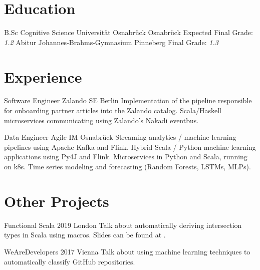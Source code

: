 \documentclass[10pt,a4paper,sans]{moderncv}
\begin{document}
\makecvtitle

\section{Education}
        {B.Sc Cognitive Science}
        {Universität Osnabrück}
        {Osnabrück}
        {}
        {Expected Final Grade: \emph{1.2}}
        {Abitur}
        {Johannes-Brahms-Gymnasium}
        {Pinneberg}
        {}
        {Final Grade: \emph{1.3}}

\section{Experience}
        {Software Engineer}
        {Zalando SE}
        {Berlin}
        {}
        {Implementation of the pipeline responsible for onboarding partner articles into the Zalando catalog.
         \newline Scala/Haskell microservices communicating using Zalando's Nakadi eventbus.}

        {Data Engineer}
        {Agile IM}
        {Osnabrück}
        {}
        {Streaming analytics / machine learning pipelines using Apache Kafka and Flink.
         \newline Hybrid Scala / Python machine learning applications using Py4J and Flink.
         \newline Microservices in Python and Scala, running on k8s.
         \newline Time series modeling and forecasting (Random Forests, LSTMs, MLPs).}

\section{Other Projects}
        {Functional Scala 2019}
        {}
        {London}
        {}
        {Talk about automatically deriving intersection types in Scala using macros.
         \newline Slides can be found at .}

        {WeAreDevelopers 2017}
        {}
        {Vienna}
        {}
        {Talk about using machine learning techniques to automatically classify GitHub repositories.}
\end{document}
